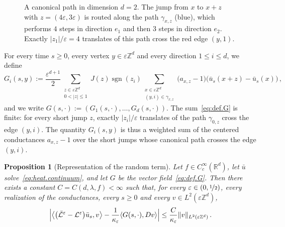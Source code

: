 \documentclass[11pt]{amsart}
\newtheorem{proposition}[theorem]{Proposition}
\numberwithin{equation}{section}
\newcommand{\Z}{\mathbb{Z}}
\newcommand{\R}{\mathbb{R}}
\newcommand{\eps}{\varepsilon}
\newcommand{\Leps}{\mathcal{L}^\varepsilon}
\newcommand{\Lbar}{\bar{\mathcal{L}}^\varepsilon}
\newcommand{\sgn}{\operatorname{sgn}}
\newcommand{\nf}{\nicefrac}
\begin{document}
\begin{figure}[ht]
\centering
{}
\caption{A canonical path in dimension $d = 2$. The jump from $x$ to $x + z$ with $z = (4 \eps, 3 \eps)$ is routed along the path $\gamma_{x,z}$ (blue), which performs $4$ steps in direction $e_1$ and then $3$ steps in direction $e_2$. Exactly $|z_1|/\eps = 4$ translates of this path cross the red edge $(y,1)$.}
\label{fig:path}
\end{figure}

For every time $s \geq 0$, every vertex $y \in \eps \Z^d$ and every direction $1 \leq i \leq d$, we define
\begin{equation} \label{eq:def.G}
    G_i(s, y) := \frac{\eps^{d+1}}{2} \sum_{\substack{z \in \eps \Z^d \\ 0 < |z| \leq 1}} J(z) \sgn(z_i) \sum_{\substack{x \in \eps \Z^d \\ (y,i) \in \gamma_{x,z}}} \bigl( a_{x,z} - 1 \bigr) \bigl( \bar u_s(x + z) - \bar u_s(x) \bigr)\,,
\end{equation}
and we write $G(s, \cdot) := (G_1(s, \cdot), \ldots, G_d(s, \cdot))$.
The sum~\eqref{eq:def.G} is finite: for every short jump $z$, exactly $|z_i|/\eps$ translates of the path $\gamma_{0,z}$ cross the edge $(y,i)$.
The quantity $G_i(s,y)$ is thus a weighted sum of the centered conductances $a_{x,z} - 1$ over the short jumps whose canonical path crosses the edge $(y,i)$.

\begin{proposition}[Representation of the random term] \label{prop:forcing}
Let $f \in C^\infty_c(\R^d)$, let $\bar u$ solve~\eqref{eq:heat.continuum}, and let $G$ be the vector field~\eqref{eq:def.G}.
Then there exists a constant $C = C(d, \lambda, f) < \infty$ such that, for every $\eps \in (0, \nf12)$, every realization of the conductances, every $s \geq 0$ and every $v \in L^2(\eps \Z^d)$,
\begin{equation} \label{eq:forcing}
    \Bigl| \bigl\langle \bigl( \Lbar - \Leps \bigr) \bar u_s, v \bigr\rangle - \frac{1}{\kappa_\eps} \langle G(s, \cdot), D v \rangle \Bigr| \leq \frac{C}{\kappa_\eps} \|v\|_{L^2(\eps \Z^d)}\,.
\end{equation}
\end{proposition}
\end{document}
